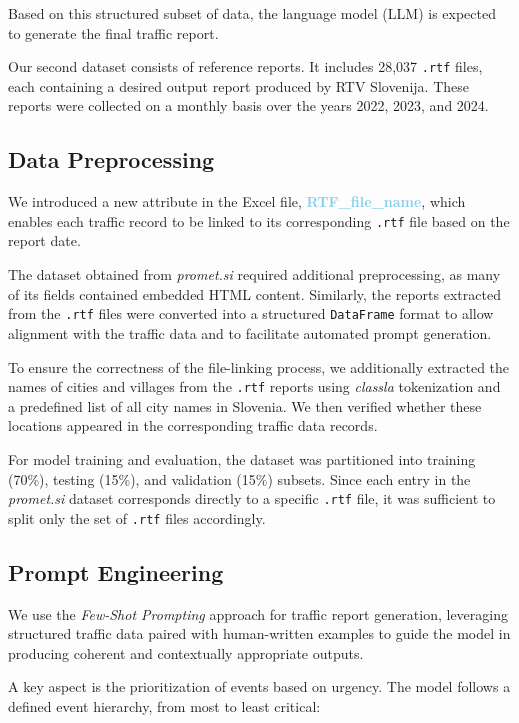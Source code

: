 \documentclass[fleqn,moreauthors,10pt]{ds_report}
\begin{document}
Based on this structured subset of data, the language model (LLM) is expected to generate the final traffic report.


Our second dataset consists of reference reports. It includes 28{,}037 \texttt{.rtf} files, each containing a desired output report produced by RTV Slovenija. These reports were collected on a monthly basis over the years 2022, 2023, and 2024.


\subsection*{Data Preprocessing}
We introduced a new attribute in the Excel file, \textcolor{SkyBlue}{\textbf{RTF\_file\_name}}, which enables each traffic record to be linked to its corresponding \texttt{.rtf} file based on the report date.

The dataset obtained from \textit{promet.si} required additional preprocessing, as many of its fields contained embedded HTML content. Similarly, the reports extracted from the \texttt{.rtf} files were converted into a structured \texttt{DataFrame} format to allow alignment with the traffic data and to facilitate automated prompt generation.

To ensure the correctness of the file-linking process, we additionally extracted the names of cities and villages from the \texttt{.rtf} reports using \textit{classla} tokenization and a predefined list of all city names in Slovenia. We then verified whether these locations appeared in the corresponding traffic data records.

For model training and evaluation, the dataset was partitioned into training (70\%), testing (15\%), and validation (15\%) subsets. Since each entry in the \textit{promet.si} dataset corresponds directly to a specific \texttt{.rtf} file, it was sufficient to split only the set of \texttt{.rtf} files accordingly.

\subsection*{Prompt Engineering}

We use the \textit{Few-Shot Prompting} approach for traffic report generation, leveraging structured traffic data paired with human-written examples to guide the model in producing coherent and contextually appropriate outputs.

A key aspect is the prioritization of events based on urgency. The model follows a defined event hierarchy, from most to least critical:
\end{document}
